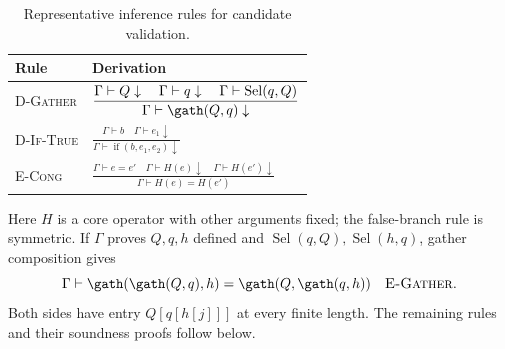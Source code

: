 \begin{table}[!htbp]
\caption{Representative inference rules for candidate validation.}
\label{tab:metadata-definedness}
\small
\begin{tabularx}{\linewidth}{@{}lY@{}}\toprule
Rule & Derivation\\\midrule
\textsc{D-Gather} &
$\displaystyle
 \frac{\Gamma\vdash Q\downarrow\quad\Gamma\vdash q\downarrow
       \quad\Gamma\vdash\operatorname{Sel}(q,Q)}
      {\Gamma\vdash\gath(Q,q)\downarrow}$\\[6pt]
\textsc{D-If-True} &
$\displaystyle
 \frac{\Gamma\vdash b\quad\Gamma\vdash e_1\downarrow}
      {\Gamma\vdash\operatorname{if}(b,e_1,e_2)\downarrow}$\\[6pt]
\textsc{E-Cong} &
$\displaystyle
 \frac{\Gamma\vdash e=e'\quad\Gamma\vdash H(e)\downarrow
       \quad\Gamma\vdash H(e')\downarrow}
      {\Gamma\vdash H(e)=H(e')}$\\[2pt]\bottomrule
\end{tabularx}
\end{table}
Here $H$ is a core operator with other arguments fixed; the false-branch
rule is symmetric. If $\Gamma$ proves $Q,q,h$ defined and
$\operatorname{Sel}(q,Q),\operatorname{Sel}(h,q)$, gather composition gives
\begin{equation}
 \Gamma\vdash\gath(\gath(Q,q),h)=\gath(Q,\gath(q,h))
 \quad\text{\textsc{E-Gather}}.
 \label{eq:validated-gather}
\end{equation}
Both sides have entry $Q[q[h[j]]]$ at every finite length.
The remaining rules and their soundness proofs follow below.

